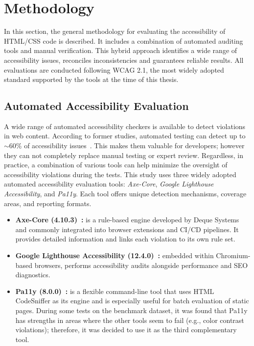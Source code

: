 \chapter{Methodology}
\label{chapter:Methodology}

In this section, the general methodology for evaluating the 
accessibility of HTML/CSS code is described. It includes a combination
of automated auditing tools and manual verification. This hybrid approach 
identifies a wide range of accessibility issues, reconciles inconsistencies and guarantees reliable results. 
All evaluations are conducted following WCAG 2.1, the most widely 
adopted standard supported by the tools at the time of this thesis.

\section{Automated Accessibility Evaluation}
A wide range of automated accessibility checkers is available to 
detect violations in web content.
According to former studies, automated testing can detect up to $\sim$60\% 
of accessibility issues~\cite{deque2023accessibility}. This makes them 
valuable for developers; however they can not completely replace manual testing or 
expert review.
Regardless, in practice, a combination of various tools can help minimize the 
oversight of accessibility violations during the tests.\newline
This study uses three widely adopted automated accessibility evaluation 
tools: \textit{Axe-Core}, \textit{Google Lighthouse Accessibility},
and \textit{Pa11y}. Each tool offers unique detection mechanisms,
coverage areas, and reporting formats.
\begin{itemize}
  \item \textbf{Axe-Core (4.10.3)~\cite{web:axecore}:} is a rule-based engine
  developed by Deque Systems and commonly integrated into browser 
  extensions and CI/CD pipelines. It provides detailed information
  and links each violation to its own rule set.
  \item \textbf{Google Lighthouse Accessibility (12.4.0)~\cite{web:lighthouse}:} 
  embedded within Chromium-based browsers, performs accessibility audits
  alongside performance and SEO diagnostics.
  \item \textbf{Pa11y (8.0.0)~\cite{web:pa11y}:} is a flexible command-line tool 
  that uses HTML CodeSniffer as its engine and is especially useful for batch 
  evaluation of static pages. During some tests on the benchmark dataset, 
  it was found that Pa11y has strengths in areas where the other 
  tools seem to fail (e.g., color contrast violations); therefore, it was 
  decided to use it as the third complementary tool.
\end{itemize}
 
